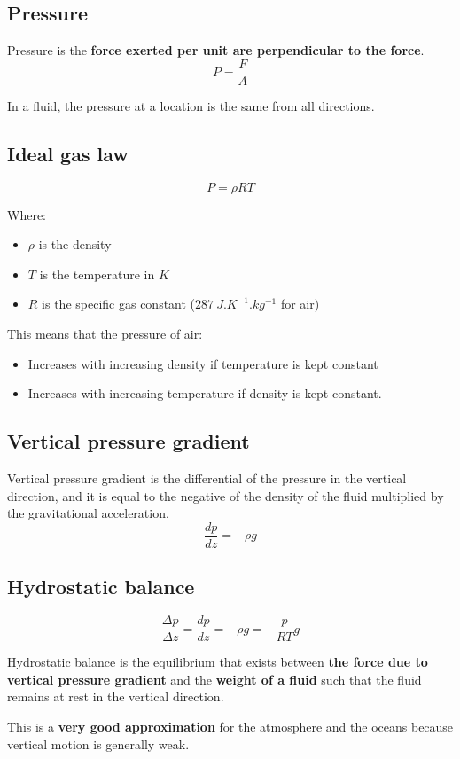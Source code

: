 \documentclass[11pt]{article}
\begin{document}
\subsection{Pressure}
\label{sec:org8628018}
Pressure is the \textbf{force exerted per unit are perpendicular to the force}.
\[P = \frac{F}{A}\]

In a fluid, the pressure at a location is the same from all directions.
\subsection{Ideal gas law}
\label{sec:orgb0214af}
\[P = \rho RT\]

Where:
\begin{itemize}
\item \(\rho\) is the density
\item \(T\) is the temperature in \(\unit{K}\)
\item \(R\) is the specific gas constant (\(\qty{287}{J.K^{-1}.kg^{-1}}\) for air)
\end{itemize}

This means that the pressure of air:
\begin{itemize}
\item Increases with increasing density if temperature is kept constant
\item Increases with increasing temperature if density is kept constant.
\end{itemize}
\subsection{Vertical pressure gradient}
\label{sec:orga9a590c}
Vertical pressure gradient is the differential of the pressure in the vertical direction, and it is equal to the negative of the density of the fluid multiplied by the gravitational acceleration.
\[\frac{dp}{dz} = - \rho g\]
\subsection{Hydrostatic balance}
\label{sec:org921da4a}
\[\frac{\Delta p}{\Delta z} = \frac{dp}{dz} = -\rho g = - \frac{p}{RT}g\]

Hydrostatic balance is the equilibrium that exists between \textbf{the force due to vertical pressure gradient} and the \textbf{weight of a fluid} such that the fluid remains at rest in the vertical direction.


This is a \textbf{very good approximation} for the atmosphere and the oceans because vertical motion is generally weak.
\end{document}
